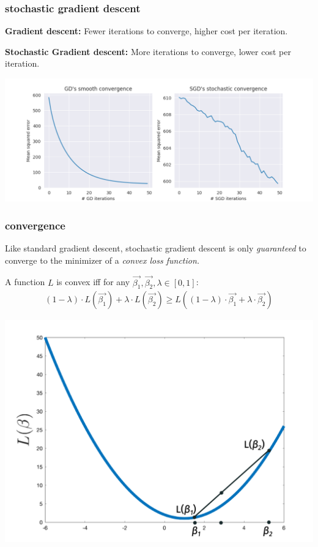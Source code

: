 \documentclass[handout,compress]{beamer}
\begin{document}
	\begin{frame}
		\frametitle{stochastic gradient descent}
		\textbf{Gradient descent:} Fewer iterations to converge, higher cost per iteration.
		
		\textbf{Stochastic Gradient descent:} More iterations to converge, lower cost per iteration.
		
		\begin{center}
			\includegraphics[width=.9\textwidth]{gd_convergence.png}
		\end{center}
	\end{frame}

\begin{frame}
	\frametitle{convergence}
	\small
		 Like standard gradient descent, stochastic gradient descent is only \emph{guaranteed} to converge to the minimizer of a \emph{convex loss function.} 
		\begin{definition}[Convex]
			A function $L$ is convex iff for any $\vec{\beta_1}, \vec{\beta_2},\lambda \in [0,1]$:
			\begin{align*}
			(1-\lambda)\cdot L(\vec{\beta_1}) + \lambda \cdot L(\vec{\beta_2}) \geq L\left((1-\lambda)\cdot\vec{\beta_1}+ \lambda \cdot\vec{\beta_2}\right)
			\end{align*}
			\vspace{-1em}
		\end{definition}
		\vspace{-2em}
		\begin{center}
			\includegraphics[width=.5\textwidth]{convex.png}
		\end{center}
\end{frame}
\end{document}
